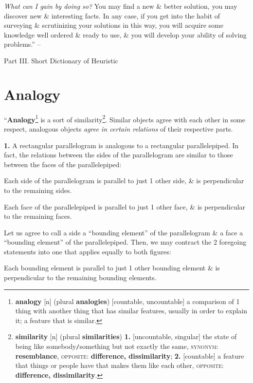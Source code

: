 \documentclass[oneside]{book}
\numberwithin{equation}{section}
\begin{document}
\textit{What can I gain by doing so?} You may find a new \& better solution, you may discover new \& interesting facts. In any case, if you get into the habit of surveying \& scrutinizing your solutions in this way, you will acquire some knowledge well ordered \& ready to use, \& you will develop your ability of solving problems.'' -- \cite[p. 35]{Polya2014}

\begin{center}
	\huge Part III. Short Dictionary of Heuristic
\end{center}

\section{Analogy}
``\textbf{Analogy}\footnote{\textbf{analogy} [n] (plural \textbf{analogies}) [countable, uncountable] a comparison of 1 thing with another thing that has similar features, usually in order to explain it; a feature that is similar.} is a sort of similarity\footnote{\textbf{similarity} [n] (plural \textbf{similarities}) \textbf{1.} [uncountable, singular] the state of being like somebody\texttt{/}something but not exactly the same, \textsc{synonym}: \textbf{resemblance}, \textsc{opposite}: \textbf{difference, dissimilarity}; \textbf{2.} [countable] a feature that things or people have that makes them like each other, \textsc{opposite}: \textbf{difference, dissimilarity}.}. Similar objects agree with each other in some respect, analogous objects \textit{agree in certain relations} of their respective parts.

\textbf{1.} A rectangular parallelogram is analogous to a rectangular parallelepiped. In fact, the relations between the sides of the parallelogram are similar to those between the faces of the parallelepiped:

Each side of the parallelogram is parallel to just 1 other side, \& is perpendicular to the remaining sides.

Each face of the parallelepiped is parallel to just 1 other face, \& is perpendicular to the remaining faces.

Let us agree to call a side a ``bounding element'' of the parallelogram \& a face a ``bounding element'' of the parallelepiped. Then, we may contract the 2 foregoing statements into one that applies equally to both figures:

Each bounding element is parallel to just 1 other bounding element \& is perpendicular to the remaining bounding elements.
\end{document}
